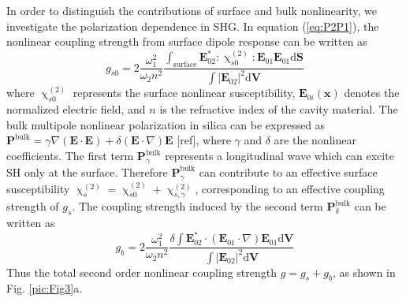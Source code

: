 \documentclass[a4paper,8pt,hyperref, twocolumn]{article}
\begin{document}
In order to distinguish the contributions of surface and bulk nonlinearity, we investigate the polarization dependence in SHG.  %
In equation (\ref{eq:P2P1}), the nonlinear coupling strength from surface dipole response can be written as
\begin{equation}
g_{s0} = 2\frac{\omega_1^2}{\omega_2n^2}\frac{\int_{\mathrm{surface} } \mathbf{E}_{02}^*:\upchi^{(2)}_{s0}:\mathbf{E}_{01}\mathbf{E}_{01} \mathrm{d}	\mathbf{S}}{\int |\mathbf{E}_{02}|^2 \mathrm{d}	\mathbf{V}}
\end{equation}
where $\upchi^{(2)}_{s0}$ represents the surface nonlinear susceptibility, $\mathbf{E}_{0i}(\mathbf{x})$ denotes the  normalized electric field, and $n$ is the refractive index of the cavity material. %
The bulk multipole nonlinear polarization in silica can be expressed as $\mathbf{P}^{\mathrm{bulk}} =  \gamma\nabla(\mathbf{E}\cdot\mathbf{E})+\delta(\mathbf{E}\cdot\nabla)\mathbf{E}$ [ref], where $\gamma$ and $\delta$ are the nonlinear coefficients. The first term $\mathbf{P}^{\mathrm{bulk}}_\gamma$ represents a longitudinal wave which can excite SH only at the surface. Therefore $\mathbf{P}^{\mathrm{bulk}}_\gamma$ can contribute to an effective surface susceptibility\cite{heinz1991second} $\upchi^{(2)}_s = \upchi^{(2)}_{s0}+\upchi^{(2)}_{s,\gamma}$, corresponding to an effective coupling strength of $g_s$. The coupling strength induced by the second term $\mathbf{P}^{\mathrm{bulk}}_\delta$ can be written as %
\begin{equation}
g_b =  2\frac{\omega_1^2}{\omega_2n^2}\frac{\delta \int \mathbf{E}_{02}^* \cdot (\mathbf{E}_{01}\cdot\nabla)\mathbf{E}_{01} \mathrm{d}	\mathbf{V}}{\int |\mathbf{E}_{02}|^2 \mathrm{d} \mathbf{V}}
\label{eq:gb}
\end{equation}
Thus the total second order nonlinear coupling strength $g = g_s+g_b$, as shown in Fig. \ref{pic:Fig3}a.
\end{document}
